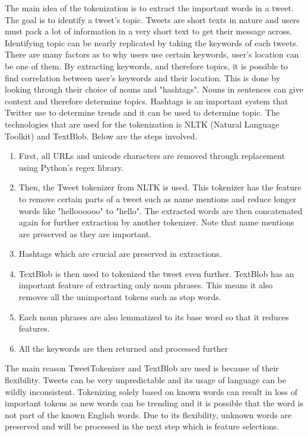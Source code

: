 \documentclass[11pt]{article}
\begin{document}
The main idea of the tokenization is to extract the
important words in a tweet. The goal is to identify a tweet's topic. Tweets are
short texts in nature and users must pack a lot of information in a very short
text to get their message
across. Identifying topic can be nearly replicated by taking the keywords of
each tweets. There are many factors as to why users use certain keywords, user's
location can be one of them. By extracting keywords, and therefore topics, it is
possible to find correlation between user's keywords and their location. 
This is done by looking through their choice of nouns and "hashtags". 
Nouns in sentences can give context and therefore determine
topics. Hashtags is an important system that Twitter use to determine trends and
it can be used to determine topic. The technologies
that are used for the tokenization is NLTK (Natural Language
Toolkit) and TextBlob. Below are the steps involved.


\begin{enumerate}
  \item First, all URLs and unicode characters are removed
  through replacement using Python's regex library.
  \item Then, the Tweet tokenizer from NLTK is used. This tokenizer has the
  feature to remove certain parts of a tweet such as name mentions and reduce longer
  words like "helloooooo" to "hello". The extracted words are then concatenated
  again for further extraction by another tokenizer. Note that name mentions are
  preserved as they are important.
  \item Hashtags which are crucial are preserved in extractions.
  \item TextBlob is then used to tokenized the tweet even further. TextBlob has
  an important feature of extracting only noun phrases. This means it also
  removes all the unimportant tokens such as stop words.
  \item Each noun phrases are also lemmatized to its base word so that it
  reduces features.
  \item All the keywords are then returned and processed further
\end{enumerate}

The main reason TweetTokenizer and TextBlob are used is because of their
flexibility. Tweets can be very unpredictable and its usage of language can be
wildly inconsistent. Tokenizing solely based on known words can result in loss of
important tokens as new words can be trending and it is
possible that the word is not part of the known English words.
Due to its flexibility, unknown words are preserved and will be processed
in the next step which is feature selections.
\end{document}
